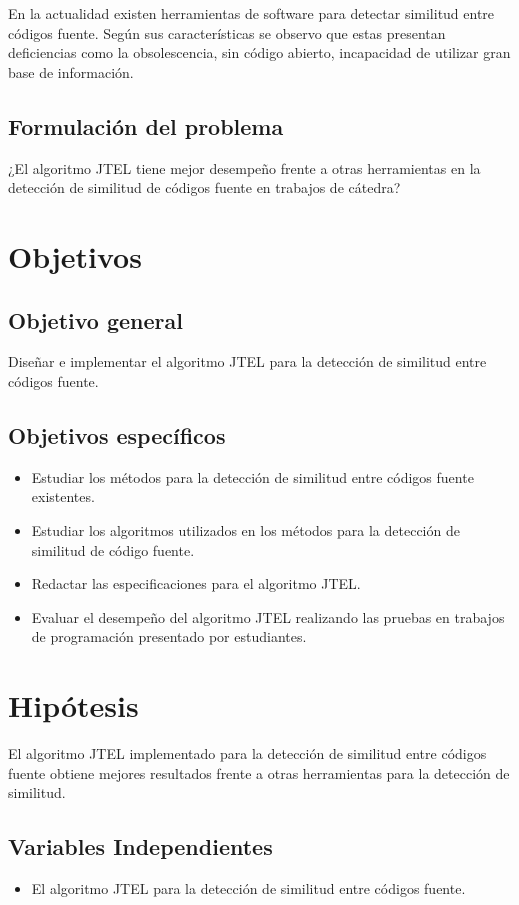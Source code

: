 En la actualidad existen herramientas de software para detectar similitud entre códigos fuente. Según sus características se observo que estas presentan deficiencias como la obsolescencia, sin código abierto, incapacidad de utilizar gran base de información.
\subsection{Formulación del problema}
¿El algoritmo JTEL tiene mejor desempeño frente a otras herramientas en la detección de similitud de códigos fuente en trabajos de cátedra?

\section{Objetivos}
\subsection{Objetivo general}
Diseñar e implementar el algoritmo JTEL para la detección de similitud entre códigos fuente.
\subsection{Objetivos específicos}
\begin{itemize}
    \item Estudiar los métodos para la detección de similitud entre códigos fuente existentes.
    \item Estudiar los algoritmos utilizados en los métodos para la detección de similitud de código fuente.
    \item Redactar las especificaciones para el algoritmo JTEL.
    \item Evaluar el desempeño del algoritmo JTEL realizando las pruebas en trabajos de programación presentado por estudiantes.
\end{itemize}

\section{Hipótesis}
El algoritmo JTEL implementado para la detección de similitud entre códigos fuente obtiene mejores resultados frente a otras herramientas para la detección de similitud.
\subsection{Variables Independientes}
\begin{itemize}
    \item El algoritmo JTEL para la detección de similitud entre códigos fuente.
\end{itemize}

